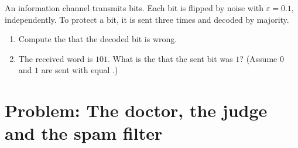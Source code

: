 \begin{exercise}[$\star\star\star$]\label{exo:g12:condprob:8}
An information channel transmits bits. Each bit is flipped by noise with
 $\varepsilon = 0.1$, independently. To protect a bit, it is sent
three times and decoded by majority.
\begin{enumerate}
  \item Compute the  that the decoded bit is wrong.
  \item The received word is $101$. What is the  that the sent
        bit was $1$? (Assume $0$ and $1$ are sent with equal .)
\end{enumerate}
\end{exercise}

\section{Problem: The doctor, the judge and the spam filter}

